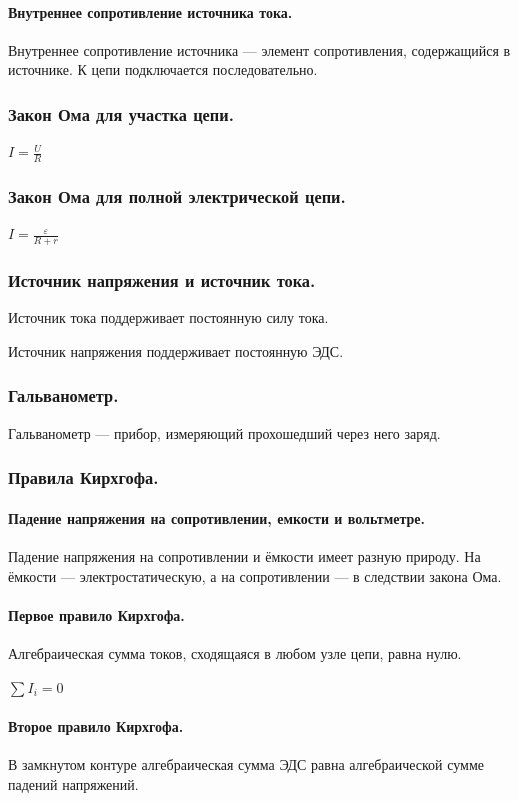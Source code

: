 \documentclass{article}
\begin{document}
            \paragraph{Внутреннее сопротивление источника тока.}
                Внутреннее сопротивление источника --- элемент сопротивления, содержащийся в источнике. К цепи подключается последовательно.
        \subsubsection{Закон Ома для участка цепи.}
                \(I = \frac{U}{R}\)
        \subsubsection{Закон Ома для полной электрической цепи.}
                \(I = \frac{\varepsilon}{R + r}\)
        \subsubsection{Источник напряжения и источник тока.}
                Источник тока поддерживает постоянную силу тока.

                Источник напряжения поддерживает постоянную ЭДС.
        \subsubsection{Гальванометр.}
                Гальванометр --- прибор, измеряющий прохошедший через него заряд.
        \subsubsection{Правила Кирхгофа.}
            \paragraph{Падение напряжения на сопротивлении, емкости и вольтметре.}
                Падение напряжения на сопротивлении и ёмкости имеет разную природу. На ёмкости --- электростатическую, а на сопротивлении --- в следствии закона Ома.
            \paragraph{Первое правило Кирхгофа.}
                Алгебраическая сумма токов, сходящаяся в любом узле цепи, равна нулю.
                
                \(\sum{I_i} = 0\)
            \paragraph{Второе правило Кирхгофа.}
                В замкнутом контуре алгебраическая сумма ЭДС равна алгебраической сумме падений напряжений.
\end{document}
